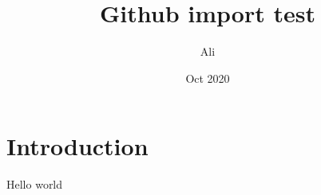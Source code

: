 \documentclass{article}
\title{Github import test}
\author{Ali}
\date{Oct 2020}
\begin{document}
\maketitle

\section{Introduction}

Hello world
\end{document}
